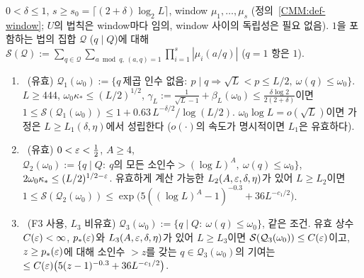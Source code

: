 \begin{theorem}\label{CMM:thm-SS}
$0<\delta\le1$, $s\ge s_0=\lceil(2+\delta)\log_2L\rceil$, window $\mu_1,\dots,\mu_s$ (정의~\ref{CMM:def-window}; $U$의 법칙은 window마다 임의, window 사이의 독립성은 필요 없음).
$1$을 포함하는 법의 집합 $\mathcal Q$ ($q\mid Q$)에 대해 $\mathcal S(\mathcal Q):=\sum_{q\in\mathcal Q}\sum_{a\bmod q,\,(a,q)=1}\prod_{i=1}^s|\mu_i(a/q)|$ ($q=1$ 항은 $1$).
\begin{enumerate}[label=(\alph*)]
\item \PROVED\ (유효) $\mathcal Q_1(\omega_0):=\{q\ \text{제곱 인수 없음}:\ p\mid q\Rightarrow\sqrt L<p\le L/2,\ \omega(q)\le\omega_0\}$.
 $L\ge444$, $\omega_0\kappa_*\le(L/2)^{1/2}$, $\gamma_L:=\frac1{\sqrt L-1}+\beta_L(\omega_0)\le\frac{\delta\log2}{2(2+\delta)}$이면
 $1\le\mathcal S(\mathcal Q_1(\omega_0))\le1+0.63\,L^{-\delta/2}/\log(L/2)$.
 $\omega_0\log L=o(\sqrt L)$이면 가정은 $L\ge L_1(\delta,\eta)$에서 성립한다
 ($o(\cdot)$의 속도가 명시적이면 $L_1$은 유효하다).
\item \PROVED\ (유효) $0<\varepsilon<\frac12$, $A\ge4$, $\mathcal Q_2(\omega_0):=\{q\mid Q:\ q\text{의 모든 소인수}>(\log L)^A,\ \omega(q)\le\omega_0\}$,
 $2\omega_0\kappa_*\le(L/2)^{1/2-\varepsilon}$. 유효하게 계산 가능한 $L_2(A,\varepsilon,\delta,\eta)$가 있어 $L\ge L_2$이면
 $1\le\mathcal S(\mathcal Q_2(\omega_0))\le\exp\bigl(5((\log L)^A-1)^{-0.3}+36L^{-c_1/2}\bigr)$.
\item \PROVED\ (F3 사용, $L_3$ 비유효) $\mathcal Q_3(\omega_0):=\{q\mid Q:\ \omega(q)\le\omega_0\}$, 같은 조건.
 유효 상수 $C(\varepsilon)<\infty$, $p_*(\varepsilon)$와 $L_3(A,\varepsilon,\delta,\eta)$가 있어 $L\ge L_3$이면 $\mathcal S(\mathcal Q_3(\omega_0))\le C(\varepsilon)$이고,
 $z\ge p_*(\varepsilon)$에 대해 소인수 $>z$를 갖는 $q\in\mathcal Q_3(\omega_0)$의 기여는 $\le C(\varepsilon)\bigl(5(z-1)^{-0.3}+36L^{-c_1/2}\bigr)$.
\end{enumerate}
\end{theorem}
